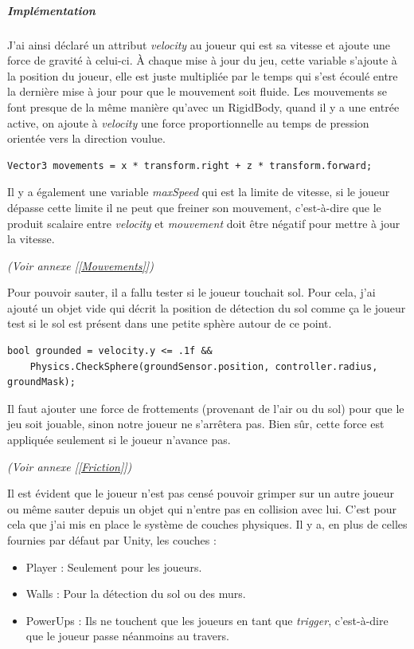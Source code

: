 \documentclass{article}
\begin{document}
\subparagraph{Implémentation}

J'ai ainsi déclaré un attribut \emph{velocity} au joueur qui est sa vitesse et ajoute une force de gravité à celui-ci. À chaque mise à jour du jeu, cette variable s'ajoute à la position du joueur, elle est juste multipliée par le temps qui s'est écoulé entre la dernière mise à jour pour que le mouvement soit fluide.
Les mouvements se font presque de la même manière qu'avec un RigidBody, quand il y a une entrée active, on ajoute à \emph{velocity} une force proportionnelle au temps de pression orientée vers la direction voulue.

\begin{lstlisting}
Vector3 movements = x * transform.right + z * transform.forward;
\end{lstlisting}

 Il y a également une variable \emph{maxSpeed} qui est la limite de vitesse, si le joueur dépasse cette limite il ne peut que freiner son mouvement, c'est-à-dire que le produit scalaire entre \emph{velocity} et \emph{mouvement} doit être négatif pour mettre à jour la vitesse.

\emph{(Voir annexe [\ref{Mouvements}])}

Pour pouvoir sauter, il a fallu tester si le joueur touchait sol. Pour cela, j'ai ajouté un objet vide qui décrit la position de détection du sol comme ça le joueur test si le sol est présent dans une petite sphère autour de ce point.

\begin{lstlisting}
bool grounded = velocity.y <= .1f &&
	Physics.CheckSphere(groundSensor.position, controller.radius, groundMask);
\end{lstlisting}

Il faut ajouter une force de frottements (provenant de l'air ou du sol) pour que le jeu soit jouable, sinon notre joueur ne s'arrêtera pas. Bien sûr, cette force est appliquée seulement si le joueur n'avance pas.

\emph{(Voir annexe [\ref{Friction}])}

Il est évident que le joueur n'est pas censé pouvoir grimper sur un autre joueur ou même sauter depuis un objet qui n'entre pas en collision avec lui. C'est pour cela que j'ai mis en place le système de couches physiques. Il y a, en plus de celles fournies par défaut par Unity, les couches :

\begin{itemize}
\item Player : Seulement pour les joueurs.

\item Walls : Pour la détection du sol ou des murs.

\item PowerUps : Ils ne touchent que les joueurs en tant que \emph{trigger}, c'est-à-dire que le joueur passe néanmoins au travers.
\end{itemize}
\end{document}
